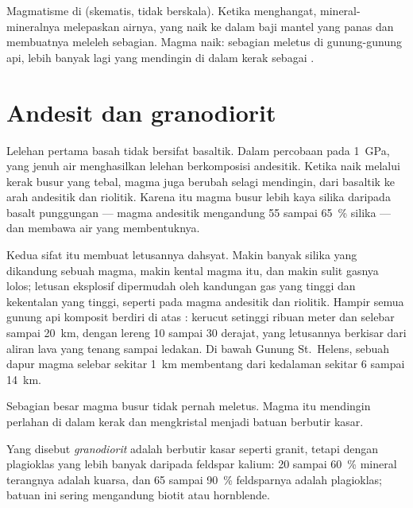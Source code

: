 \begin{omfigure}
{\small Magmatisme di  (skematis, tidak berskala). Ketika 
menghangat, mineral-mineralnya melepaskan airnya, yang naik ke dalam baji mantel
yang panas dan membuatnya meleleh sebagian. Magma naik: sebagian meletus di
gunung-gunung api, lebih banyak lagi yang mendingin di dalam kerak sebagai
.}
\end{omfigure}

\section{Andesit dan granodiorit}

Lelehan pertama  basah tidak bersifat basaltik. Dalam percobaan pada
\qty{1}{GPa},  yang jenuh air menghasilkan lelehan berkomposisi
andesitik. Ketika naik melalui kerak busur yang tebal, magma juga berubah
selagi mendingin, dari basaltik ke arah andesitik dan riolitik. Karena itu
magma busur lebih kaya silika daripada basalt punggungan --- magma andesitik
mengandung 55 sampai \qty{65}{\percent} silika --- dan membawa air yang
membentuknya.

Kedua sifat itu membuat letusannya dahsyat. Makin banyak silika yang
dikandung sebuah magma, makin kental magma itu, dan makin sulit gasnya lolos;
letusan eksplosif dipermudah oleh kandungan gas yang tinggi dan kekentalan yang
tinggi, seperti pada magma andesitik dan riolitik. Hampir semua gunung api
komposit berdiri di atas : kerucut setinggi ribuan meter dan
selebar sampai \qty{20}{km}, dengan lereng 10 sampai 30 derajat, yang letusannya
berkisar dari aliran lava yang tenang sampai ledakan. Di bawah Gunung St.~Helens,
sebuah dapur magma selebar sekitar \qty{1}{km}
membentang dari kedalaman sekitar 6 sampai \qty{14}{km}.

Sebagian besar magma busur tidak pernah meletus. Magma itu mendingin perlahan di
dalam kerak dan mengkristal menjadi batuan berbutir kasar.

\begin{definition}[Granodiorit]\label{def:g12:subduction-magmatism:granodiorite}
Yang disebut \emph{granodiorit} adalah 
berbutir kasar seperti granit, tetapi dengan plagioklas yang lebih banyak
daripada feldspar kalium: 20 sampai \qty{60}{\percent} mineral terangnya
adalah kuarsa, dan 65 sampai \qty{90}{\percent} feldsparnya adalah plagioklas;
batuan ini sering mengandung biotit atau hornblende.
\end{definition}

